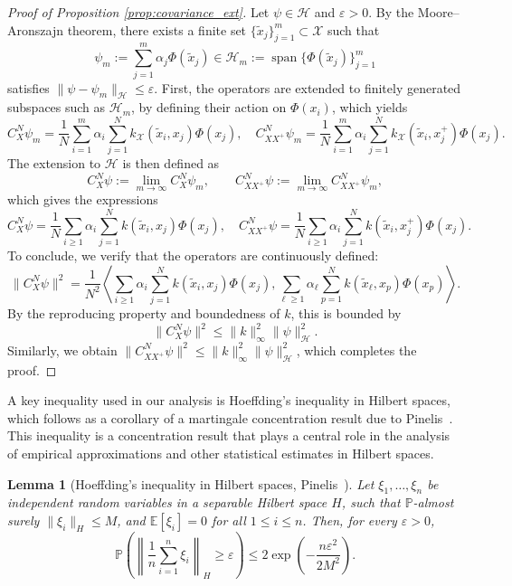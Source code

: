 \documentclass{article}
\newtheorem{lem}{Lemma}
\begin{document}
\begin{proof}[Proof of Proposition \ref{prop:covariance_ext}]
    Let \( \psi \in \mathcal{H} \) and \( \varepsilon > 0 \). By the Moore–Aronszajn theorem, there exists a finite set \( \{ \tilde{x}_j \}_{j=1}^m \subset \mathcal{X} \) such that 
    \[
        \psi_m := \sum_{j=1}^m \alpha_j \Phi(\tilde{x}_j) \in \mathcal{H}_{m} := \operatorname{span}\{ \Phi(\tilde{x}_j) \}_{j=1}^m
    \]
    satisfies \( \| \psi - \psi_m \|_{\mathcal{H}} \leq \varepsilon \). First, the operators are extended to finitely generated subspaces such as \( \mathcal{H}_{m} \), by defining their action on \( \Phi(x_i) \), which yields
    \[
        C_X^N \psi_m =
        \frac{1}{N} \sum_{i=1}^m \alpha_i \sum_{j = 1}^N k_{\mathcal{X}}(\tilde{x}_i, x_j) \Phi(x_j), \quad 
        C_{XX^+}^N \psi_m =
        \frac{1}{N} \sum_{i=1}^m \alpha_i \sum_{j = 1}^N k_{\mathcal{X}}(\tilde{x}_i, x_j^+) \Phi(x_j).
    \]
    The extension to \( \mathcal{H} \) is then defined as
    \[
        C_X^N \psi := \lim_{m \to \infty} C_X^N \psi_m, \qquad 
        C_{XX^+}^N \psi := \lim_{m \to \infty} C_{XX^+}^N \psi_m,
    \]
    which gives the expressions
    \[
        C_X^N \psi =
        \frac{1}{N} \sum_{i \geq 1} \alpha_i \sum_{j = 1}^N k(\tilde{x}_i, x_j) \Phi(x_j), \quad 
        C_{XX^+}^N \psi =
        \frac{1}{N} \sum_{i \geq 1} \alpha_i \sum_{j = 1}^N k(\tilde{x}_i, x_j^+) \Phi(x_j).
    \]
    To conclude, we verify that the operators are continuously defined:
    \[
        \| C_X^N \psi \|^2 
        = \frac{1}{N^2} \left\langle \sum_{i \geq 1} \alpha_i \sum_{j = 1}^N k(\tilde{x}_i, x_j) \Phi(x_j), \sum_{\ell \geq 1} \alpha_\ell \sum_{p = 1}^N k(\tilde{x}_\ell, x_p) \Phi(x_p) \right\rangle.
    \]
    By the reproducing property and boundedness of \(k\), this is bounded by
    \[
        \| C_X^N \psi \|^2 \leq \| k \|_\infty^2 \| \psi \|_{\mathcal{H}}^2.
    \]
    Similarly, we obtain \( \| C_{XX^+}^N \psi \|^2 \leq \| k \|_\infty^2 \| \psi \|_{\mathcal{H}}^2 \), which completes the proof.
\end{proof}

A key inequality used in our analysis is Hoeffding’s inequality in Hilbert spaces, which follows as a corollary of a martingale concentration result due to Pinelis~\cite{Pinelis1994OptimumSpaces}. This inequality is a concentration result that plays a central role in the analysis of empirical approximations and other statistical estimates in Hilbert spaces.

\begin{lem}[Hoeffding's inequality in Hilbert spaces, Pinelis~\cite{Pinelis1994OptimumSpaces}]
Let \( \xi_1, \dots, \xi_n \) be independent random variables in a separable Hilbert space \( H \), such that \( \mathbb{P} \)-almost surely \( \| \xi_i \|_H \leq M \), and \( \mathbb{E}[\xi_i] = 0 \) for all \( 1 \leq i \leq n \). Then, for every \( \varepsilon > 0 \),
\[
\mathbb{P} \left( \left\| \frac{1}{n} \sum_{i=1}^n \xi_i \right\|_H \geq \varepsilon \right) \leq 2 \exp \left( -\frac{n \varepsilon^2}{2M^2} \right).
\]
\end{lem}
\end{document}
